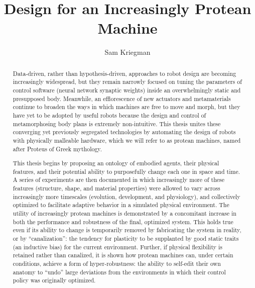 \documentclass[12pt]{report}
\title{Design for an Increasingly Protean Machine}
\author{Sam Kriegman}
\begin{document}
\maketitle



\begin{abstract}
	
\vspace{10mm}


Data-driven, rather than hypothesis-driven, 
approaches to robot design are becoming increasingly widespread, but they remain narrowly focused on tuning the parameters of control software (neural network synaptic weights) inside an overwhelmingly static and presupposed body.
Meanwhile, an efflorescence of new actuators and metamaterials continue to 
broaden the ways
in which machines are free to 
move and morph,
but they have yet to be adopted by useful robots because 
the design and control of 
metamorphosing body plans 
is extremely
non-intuitive.
This thesis unites these 
converging yet previously 
segregated
technologies
by automating the design of robots with physically malleable hardware,
which we will refer to as protean machines, named after Proteus
of Greek mythology.

This thesis begins by proposing an ontology of embodied agents, their physical features, and their potential ability to purposefully change each one in space and time.
A series of experiments are then documented in which increasingly more of these features (structure, shape, and material properties) were allowed to vary across increasingly more timescales (evolution, development, and physiology), and collectively optimized to facilitate 
adaptive
behavior in a simulated physical environment.
The utility of increasingly protean machines is demonstrated by a concomitant increase in both the performance and robustness of the final, optimized system.
This holds true even if its ability to change is temporarily removed by fabricating the system in reality, or by ``canalization'': the tendency for plasticity to be supplanted by good static traits (an inductive bias) for the current environment.
Further, if physical flexibility is retained rather than canalized, it is shown how protean machines can, under certain conditions, achieve a form of hyper-robustness: the ability to self-edit their own anatomy to ``undo'' large deviations from the environments in which their control policy was originally optimized.


\end{abstract}
\end{document}
